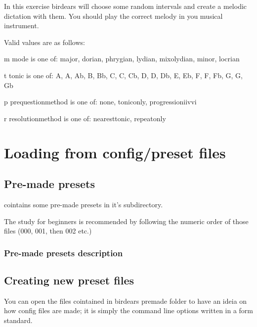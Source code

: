 \documentclass[letterpaper,10pt,english]{sphinxmanual}
\begin{document}
\begin{sphinxVerbatim}[commandchars=\\\{\}]
  In this exercise birdears will choose some random intervals and create a
  melodic dictation with them. You should play the correct melody in you
  musical instrument.

  Valid values are as follows:

  \PYGZhy{}m \PYGZlt{}mode\PYGZgt{} is one of: major, dorian, phrygian, lydian, mixolydian, minor,
  locrian

  \PYGZhy{}t \PYGZlt{}tonic\PYGZgt{} is one of: A, A\PYGZsh{}, Ab, B, Bb, C, C\PYGZsh{}, Cb, D, D\PYGZsh{}, Db, E, Eb, F,
  F\PYGZsh{}, Fb, G, G\PYGZsh{}, Gb

  \PYGZhy{}p \PYGZlt{}prequestion\PYGZus{}method\PYGZgt{} is one of: none, tonic\PYGZus{}only, progression\PYGZus{}i\PYGZus{}iv\PYGZus{}v\PYGZus{}i

  \PYGZhy{}r \PYGZlt{}resolution\PYGZus{}method\PYGZgt{} is one of: nearest\PYGZus{}tonic, repeat\PYGZus{}only
\end{sphinxVerbatim}



\section{Loading from config/preset files}
\label{\detokenize{using:loading-from-config-preset-files}}

\subsection{Pre-made presets}
\label{\detokenize{using:pre-made-presets}}
 cointains some pre-made presets in it’s 
subdirectory.

The study for beginners is recommended by following the numeric order of
those files (000, 001, then 002 etc.)


\subsubsection{Pre-made presets description}
\label{\detokenize{using:pre-made-presets-description}}


\subsection{Creating new preset files}
\label{\detokenize{using:creating-new-preset-files}}
You can open the files cointained in birdears premade 
folder to have an ideia on how config files are made; it is simply the
command line options written in a form  standard.
\end{document}
